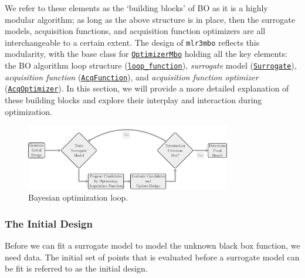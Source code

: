 We refer to these elements as the `building blocks' of BO as it is a
highly modular algorithm; as long as the above structure is in place,
then the surrogate models, acquisition functions, and acquisition
function optimizers are all interchangeable to a certain extent. The
design of \texttt{mlr3mbo} reflects this modularity, with the base class
for
\href{https://mlr3mbo.mlr-org.com/reference/mlr_optimizers_mbo.html}{\texttt{OptimizerMbo}}
holding all the key elements: the BO algorithm loop structure
(\href{https://mlr3mbo.mlr-org.com/reference/loop_function.html}{\texttt{loop\_function}}),
\emph{surrogate} model
(\href{https://mlr3mbo.mlr-org.com/reference/Surrogate.html}{\texttt{Surrogate}}),
\emph{acquisition function}
(\href{https://mlr3mbo.mlr-org.com/reference/AcqFunction.html}{\texttt{AcqFunction}}),
and \emph{acquisition function optimizer}
(\href{https://mlr3mbo.mlr-org.com/reference/AcqOptimizer.html}{\texttt{AcqOptimizer}}).
In this section, we will provide a more detailed explanation of these
building blocks and explore their interplay and interaction during
optimization.

\begin{figure}

{\centering \includegraphics[width=0.8\textwidth,height=\textheight]{chapters/chapter5/Figures/mlr3book_figures-10.png}

}

\caption{\label{fig-optimization-loop}Bayesian optimization loop.}

\end{figure}

\hypertarget{sec-bayesian-optimization-initial}{%
\subsubsection{The Initial
Design}\label{sec-bayesian-optimization-initial}}

Before we can fit a surrogate model to model the unknown black box
function, we need data. The initial set of points that is evaluated
before a surrogate model can be fit is referred to as the initial
design.

